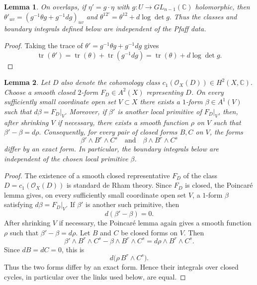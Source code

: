 \documentclass[12pt,reqno,a4paper]{amsart}
\numberwithin{equation}{section}
\theoremstyle{plain}
\newtheorem{lemma}[lemma]{Lemma}
\theoremstyle{definition}
\begin{document}
 


\begin{lemma}  \label{lem:pfaff-frame}
On overlaps, if $\eta' = g \cdot \eta$ with $g:U \to GL_{n-1}(\mathbb{C})$ holomorphic, then $\theta'_{uv} = (g^{-1} \theta g + g^{-1}dg)_{uv}$ and $\theta^{12'} = \theta^{12} + d \log \det g.$ Thus the classes and boundary integrals defined below are independent of the Pfaff data.  
\end{lemma}
\begin{proof}
Taking the trace of \(\theta'=g^{-1}\theta g+g^{-1}dg\) gives
\[
\operatorname{tr}(\theta')
=
\operatorname{tr}(\theta)+\operatorname{tr}(g^{-1}dg)
=
\operatorname{tr}(\theta)+d\log\det g.
\]
\end{proof}
 
 

\begin{lemma}\label{lem:JD-local-potential}
Let \(D\) also denote the cohomology class \(c_1(\mathcal O_X(D))\in
H^2(X,\mathbb C)\). Choose a smooth closed \(2\)-form
 $
F_D\in A^2(X)
$
representing \(D\). On every sufficiently small coordinate open set
\(V\subset X\) there exists a \(1\)-form \(\beta\in A^1(V)\) such that
$
d\beta=F_D|_V.
$
Moreover, if \(\beta'\) is another local primitive of \(F_D|_V\), then, after
shrinking \(V\) if necessary, there exists a smooth function \(\rho\) on \(V\)
such that
$
\beta'-\beta=d\rho.
$
Consequently, for every pair of closed forms \(B,C\) on \(V\), the forms
\[
\beta'\wedge B^r\wedge C^s
\quad\text{and}\quad
\beta\wedge B^r\wedge C^s
\]
differ by an exact form. In particular, the boundary integrals below are
independent of the chosen local primitive \(\beta\).
\end{lemma}

\begin{proof}
The existence of a smooth closed representative \(F_D\) of the class
\(D=c_1(\mathcal O_X(D))\) is standard de Rham theory. Since \(F_D\) is closed,
the Poincar\'e lemma gives, on every sufficiently small coordinate open set
\(V\), a \(1\)-form \(\beta\) satisfying \(d\beta=F_D|_V\).
If \(\beta'\) is another such primitive, then
\[
d(\beta'-\beta)=0.
\]
After shrinking \(V\) if necessary, the Poincar\'e lemma again gives a smooth
function \(\rho\) such that
$\beta'-\beta=d\rho.
$
Let \(B\) and \(C\) be closed forms on \(V\). Then
\[
\beta'\wedge B^r\wedge C^s
-
\beta\wedge B^r\wedge C^s
=
d\rho\wedge B^r\wedge C^s.
\]
Since \(dB=dC=0\), this is
\[
d\bigl(\rho\, B^r\wedge C^s\bigr).
\]
Thus the two forms differ by an exact form. Hence their integrals over closed
cycles, in particular over the links used below, are equal.
\end{proof}
 
\end{document}

